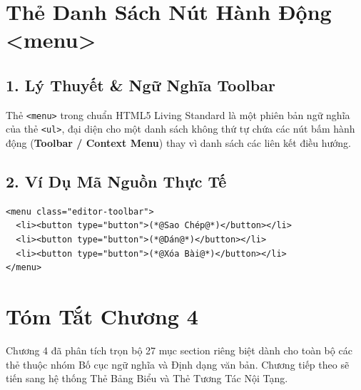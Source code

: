 \documentclass[11pt,oneside]{book}
\newcommand{\codeinline}[1]{\textcolor{accentOrange}{\texttt{#1}}}
\newcommand{\term}[1]{\textbf{\textcolor{primaryBlue}{#1}}}
\begin{document}
\section{Thẻ Danh Sách Nút Hành Động <menu>}
\subsection{1. Lý Thuyết \& Ngữ Nghĩa Toolbar}
Thẻ \codeinline{<menu>} trong chuẩn HTML5 Living Standard là một phiên bản ngữ nghĩa của thẻ \codeinline{<ul>}, đại diện cho một danh sách không thứ tự chứa các nút bấm hành động (\term{Toolbar / Context Menu}) thay vì danh sách các liên kết điều hướng.

\subsection{2. Ví Dụ Mã Nguồn Thực Tế}
\begin{codeWindow}
\begin{lstlisting}[language=HTML5]
<menu class="editor-toolbar">
  <li><button type="button">(*@Sao Chép@*)</button></li>
  <li><button type="button">(*@Dán@*)</button></li>
  <li><button type="button">(*@Xóa Bài@*)</button></li>
</menu>
\end{lstlisting}
\end{codeWindow}

\begin{browserWindow}
\sffamily\small
{} \;\;
 \;\;
\end{browserWindow}

\section{Tóm Tắt Chương 4}
Chương 4 đã phân tích trọn bộ 27 mục section riêng biệt dành cho toàn bộ các thẻ thuộc nhóm Bố cục ngữ nghĩa và Định dạng văn bản. Chương tiếp theo sẽ tiến sang hệ thống Thẻ Bảng Biểu và Thẻ Tương Tác Nội Tạng.
\end{document}
